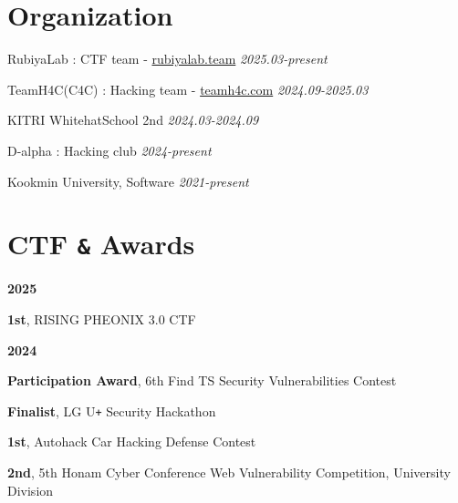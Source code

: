 \documentclass[margin,line]{resume}
\begin{document}
\begin{resume}
 	

 	    \section{\mysidestyle Organization}%
 	      \begin{list2}
 	      \item{RubiyaLab : CTF team - \href{https://rubiyalab.team}{rubiyalab.team} \hfill \textsl{2025.03-present}}
            \item{TeamH4C(C4C) : Hacking team - \href{https://teamh4c.com}{teamh4c.com} \hfill \textsl{2024.09-2025.03}}
 	      \item{KITRI WhitehatSchool 2nd  \hfill \textsl{2024.03-2024.09}}
            \item{D-alpha : Hacking club  \hfill \textsl{2024-present}}
 	      \item{Kookmin University, Software  \hfill \textsl{2021-present}}
 	      
 	      \end{list2}


        \section{\mysidestyle CTF \texttt{\&} Awards}
      
        \textbf{2025}
        \vspace{1mm}
        \begin{list2}
          \item \textbf{1st}, RISING PHEONIX 3.0 CTF
        \end{list2}
        
        \textbf{2024}
        \vspace{1mm}
        \begin{list2}
          \item \textbf{Participation Award}, 6th Find TS Security Vulnerabilities Contest
          \item \textbf{Finalist}, LG U\texttt{+} Security Hackathon
          \item \textbf{1st}, Autohack Car Hacking Defense Contest
          \item \textbf{2nd}, 5th Honam Cyber Conference Web Vulnerability Competition, University Division
        \end{list2}


\end{resume}
\end{document}
